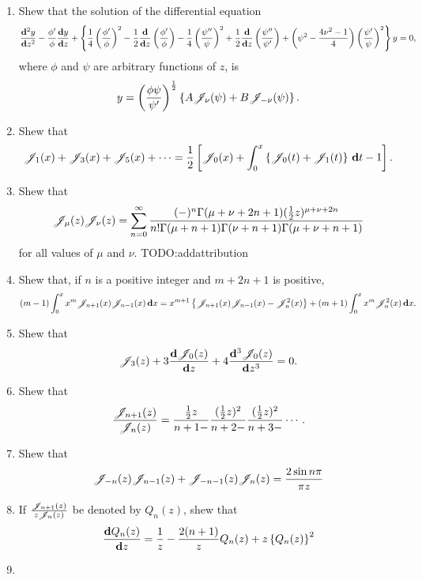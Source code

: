 \begin{enumerate}
\item
  Shew that the solution of the differential equation
  $$
  \frac{\mathbf{d}^{2} y}{\mathbf{d} z^{2}}
  -
  \frac{\phi'}{\phi} \frac{\mathbf{d} y}{\mathbf{d} z}
  +
  \left\{ 
    \frac{1}{4}
    \left( \frac{\phi'}{\phi} \right)^{2}
    - \frac{1}{2} \frac{\mathbf{d}}{\mathbf{d} z} \left( \frac{\phi'}{\phi} \right)
    - \frac{1}{4} \left( \frac{\psi''}{\psi} \right)^{2}
    + \frac{1}{2} \frac{\mathbf{d}}{\mathbf{d} z} \left( \frac{\psi''}{\psi'} \right)
    +
    \left( \psi^{2} - \frac{4\nu^{2}-1}{4} \right)
    \left( \frac{\psi'}{\psi} \right)^{2}
   \right\}
  y
  =
  0,
  $$
  where $\phi$ and $\psi$ are arbitrary functions of $z$, is
  $$
  y = \left( \frac{\phi\psi}{\psi'} \right)^{\frac{1}{2}}
  \left\{ A \mathscr{J}_{\nu}(\psi) + B\mathscr{J}_{-\nu}(\psi) \right\}.
  $$
\item
  Shew that
  $$
  \mathscr{J}_{1}(x)
  +
  \mathscr{J}_{3}(x)
  +
  \mathscr{J}_{5}(x)
  +
  \cdots
  =
  \frac{1}{2}
  \left[ 
    \mathscr{J}_{0}(x)
    +
    \int_{0}^{x}
    \left\{ 
      \mathscr{J}_{0}(t) + \mathscr{J}_{1}(t)
     \right\}
    \, \mathbf{d} t
    -
    1
     \right].
  $$
\item
  Shew that
  $$
  \mathscr{J}_{\mu}(z) \mathscr{J}_{\nu}(z)
  =
  \sum_{n=0}^{\infty}
  \frac{(-)^{n} \Gamma(\mu+\nu+2n+1) (\frac{1}{2} z)^{\mu+\nu+2n}}{
    n! \Gamma(\mu+n+1) \Gamma(\nu+n+1) \Gamma(\mu+\nu+n+1)}
  $$
  for all values of $\mu$ and $\nu$.
  TODO:addattribution
\item
  Shew that, if $n$ is a positive integer and $m+2n+1$ is positive,
  $$
  (m-1)
  \int_{0}^{x}
  x^{m} \mathscr{J}_{n+1}(x) \mathscr{J}_{n-1}(x)
  \, \mathbf{d} x
  =
  x^{m+1}
  \left\{ 
    \mathscr{J}_{n+1}(x)\mathscr{J}_{n-1}(x) - \mathscr{J}_{n}^{2}(x)
   \right\}
  +
  (m+1)
  \int_{0}^{x} x^{m} \mathscr{J}_{n}^{2}(x)
  \, \mathbf{d} x.
  $$
\item
  Shew that
  $$
  \mathscr{J}_{3}(z)
  +
  3 \frac{\mathbf{d} \mathscr{J}_{0}(z)}{\mathbf{d} z}
  +
  4 \frac{\mathbf{d}^{3} \mathscr{J}_{0}(z)}{\mathbf{d} z^{3}}
  =
  0.
  $$
\item
  Shew that
  $$
  \frac{\mathscr{J}_{n+1}(z)}{\mathscr{J}_{n}(z)}
  =
  \frac{ \frac{1}{2} z }{n+1-}
  \frac{ (\frac{1}{2} z)^{2} }{n+2-}
  \frac{ (\frac{1}{2} z)^{2} }{n+3-}
  \cdots.
  $$
\item
  Shew that
  $$
  \mathscr{J}_{-n}(z) \mathscr{J}_{n-1}(z)
  +
  \mathscr{J}_{-n-1}(z) \mathscr{J}_{n}(z)
  =
  \frac{2 \sin n\pi}{\pi z}
  $$
\item
  If $\frac{\mathscr{J}_{n+1}(z)}{z \mathscr{J}_{n}(z)}$ be denoted by $Q_{n}(z)$,
  shew that
  $$
  \frac{ \mathbf{d} Q_{n}(z) }{\mathbf{d} z}
  =
  \frac{1}{z}
  -
  \frac{2(n+1)}{z}
  Q_{n}(z)
  +
  z \left\{  Q_{n}(z)  \right\}^{2}
  $$
\item

\end{enumerate}
